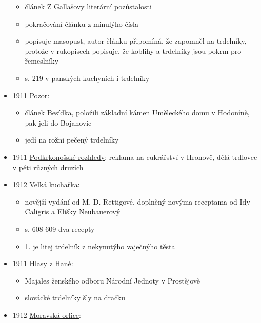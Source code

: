 \begin{itemize}
  \begin{itemize}
  \tightlist
  \item
    článek Z Gallašovy literární pozůstalosti
  \item
    pokračování článku z minulýho čísla
  \item
    popisuje masopust, autor článku připomíná, že zapomněl na trdelníky,
    protože v rukopisech popisuje, že koblihy a trdelníky jsou pokrm pro
    řemeslníky
  \item
    s. 219 v panských kuchyních i trdelníky
  \end{itemize}
\item
  1911
  \href{https://www.digitalniknihovna.cz/vkol/uuid/uuid:be493458-5dbc-42df-9ca1-fa5bef6ae4c6}{Pozor}:

  \begin{itemize}
  \tightlist
  \item
    článek Besídka, položili základní kámen Uměleckého domu v Hodoníně,
    pak jeli do Bojanovic
  \item
    jedí na rožni pečený trdelníky
  \end{itemize}
\item
  1911
  \href{https://ceskadigitalniknihovna.cz/view/uuid:5a976b57-57a4-491f-b403-535f71c739a6?page=uuid\%3A2ec0de06-85d4-11e4-8faf-00155d010f03&fulltext=trdlovec&source=svkhk}{Podkrkonošské
  rozhledy}: reklama na cukrářství v Hronově, dělá trdlovec v pěti
  různých druzích
\item
  1912
  \href{https://ndk.cz/view/uuid:e8f12a30-1b67-11e7-96ce-005056827e51?page=uuid\%3Af8cffa60-2933-11e7-a38c-005056827e51}{Velká
  kuchařka}:

  \begin{itemize}
  \tightlist
  \item
    novější vydání od M. D. Rettigové, doplněný novýma receptama od Idy
    Caligris a Elišky Neubauerový
  \item
    s. 608-609 dva recepty
  \item
    1. je litej trdelník z nekynutýho vaječnýho těsta
  \end{itemize}
\item
  1911
  \href{https://www.digitalniknihovna.cz/vkol/uuid/uuid:d4380ff6-8a62-49b7-8196-d84c1ad69a53}{Hlasy
  z Hané}:

  \begin{itemize}
  \tightlist
  \item
    Majales ženského odboru Národní Jednoty v Prostějově
  \item
    slovácké trdelníky šly na dračku
  \end{itemize}
\item
  1912
  \href{https://ceskadigitalniknihovna.cz/view/uuid:2c2f1570-b8b8-11de-b399-000d606f5dc6?page=uuid:625e3e20-b7e9-11de-8b7d-000d606f5dc6&source=mzk}{Moravská
  orlice}:


\end{itemize}
